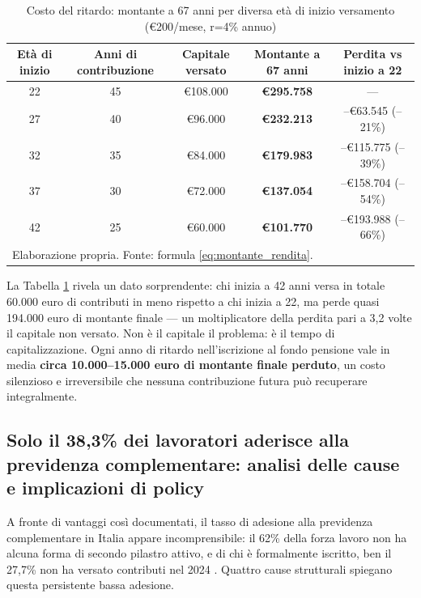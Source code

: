 \begin{table}[h!]
\centering
\small
\caption{Costo del ritardo: montante a 67 anni per diversa età di inizio
         versamento (€200/mese, r=4\% annuo)}
\label{tab:costo_ritardo}
\begin{tabular}{ccccc}
\toprule
\textbf{Età di inizio} & \textbf{Anni di contribuzione} &
\textbf{Capitale versato} & \textbf{Montante a 67 anni} &
\textbf{Perdita vs inizio a 22} \\
\midrule
22 & 45 & €108.000 & \textbf{€295.758} & --- \\
27 & 40 & €96.000  & \textbf{€232.213} & --€63.545 (--21\%) \\
32 & 35 & €84.000  & \textbf{€179.983} & --€115.775 (--39\%) \\
37 & 30 & €72.000  & \textbf{€137.054} & --€158.704 (--54\%) \\
42 & 25 & €60.000  & \textbf{€101.770} & --€193.988 (--66\%) \\
\bottomrule
\multicolumn{5}{l}{\small Elaborazione propria. Fonte: formula \eqref{eq:montante_rendita}.}
\end{tabular}
\end{table}

\noindent
La Tabella \ref{tab:costo_ritardo} rivela un dato sorprendente:
chi inizia a 42 anni versa in totale 60.000 euro di contributi
in meno rispetto a chi inizia a 22, ma perde quasi 194.000 euro
di montante finale — un moltiplicatore della perdita pari a 3,2 volte
il capitale non versato.
Non è il capitale il problema: è il tempo di capitalizzazione.
Ogni anno di ritardo nell'iscrizione al fondo pensione vale in media
\textbf{circa 10.000--15.000 euro di montante finale perduto},
un costo silenzioso e irreversibile che nessuna contribuzione futura
può recuperare integralmente.

\subsection{Solo il 38,3\% dei lavoratori aderisce alla previdenza
            complementare: analisi delle cause e implicazioni di policy}
\label{sub:bassa_adesione}

\noindent
A fronte di vantaggi così documentati, il tasso di adesione alla
previdenza complementare in Italia appare incomprensibile:
il 62\% della forza lavoro non ha alcuna forma di secondo pilastro attivo,
e di chi è formalmente iscritto, ben il 27,7\% non ha versato contributi
nel 2024 \cite{web:76, web:85, COVIP2025}.
Quattro cause strutturali spiegano questa persistente bassa adesione.

